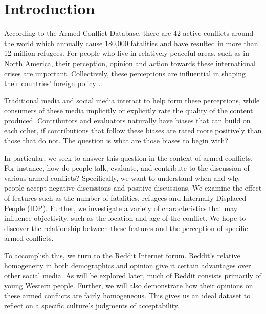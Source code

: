 \section{Introduction}
According to the Armed Conflict Database, there are 42 active conflicts around the world which annually cause 180,000 fatalities and have resulted in more than 12 million refugees. For people who live in relatively peaceful areas, such as in North America, their perception, opinion and action towards these international crises are important. Collectively, these perceptions are influential in shaping their countries' foreign policy \cite{Gelpi2009}. 

Traditional media and social media interact to help form these perceptions, while consumers of these media implicitly or explicitly rate the quality of the content produced. Contributors and evaluators naturally have biases that can build on each other, if contributions that follow these biases are rated more positively than those that do not. The question is what are those biases to begin with?

In particular, we seek to answer this question in the context of armed conflicts. For instance, how do people talk, evaluate, and contribute to the discussion of various armed conflicts? Specifically, we want to understand when and why people accept negative discussions and positive discussions. We examine the effect of features such as the number of fatalities, refugees and Internally Displaced People (IDP). Further, we investigate a variety of characteristics that may influence objectivity, such as the location and age of the conflict. We hope to discover the relationship between these features and the perception of specific armed conflicts.

To accomplish this, we turn to the Reddit Internet forum. Reddit's relative homogeneity in both demographics and opinion give it certain advantages over other social media. As will be explored later, much of Reddit consists primarily of young Western people. Further, we will also demonstrate how their opinions on these armed conflicts are fairly homogeneous. This gives us an ideal dataset to reflect on a specific culture's judgments of acceptability.

